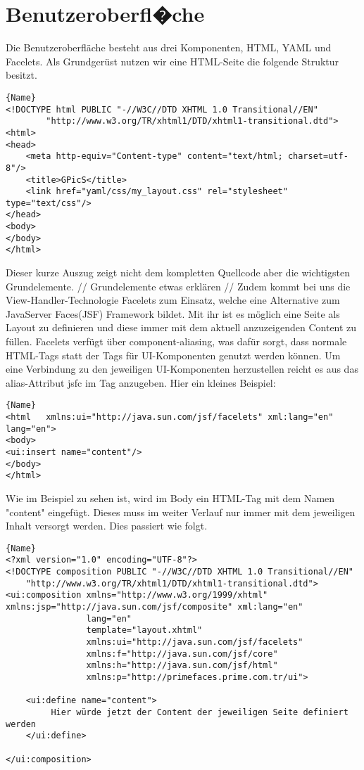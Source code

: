 \section{Benutzeroberfl�che}
\label{JumpBenutzeroberflaeche}
Die Benutzeroberfläche besteht aus drei Komponenten, HTML, YAML und Facelets. Als Grundgerüst nutzen wir eine HTML-Seite die folgende Struktur besitzt. 
\begin{lstlisting}[caption=HTML-Grundgerüst]{Name}
<!DOCTYPE html PUBLIC "-//W3C//DTD XHTML 1.0 Transitional//EN"
        "http://www.w3.org/TR/xhtml1/DTD/xhtml1-transitional.dtd">
<html>
<head>
	<meta http-equiv="Content-type" content="text/html; charset=utf-8"/>
	<title>GPicS</title>
	<link href="yaml/css/my_layout.css" rel="stylesheet" type="text/css"/>
</head>
<body>
</body>
</html>    
\end{lstlisting}
Dieser kurze Auszug zeigt nicht dem kompletten Quellcode aber die wichtigsten Grundelemente.
//
Grundelemente etwas erklären
//
Zudem kommt bei uns die View-Handler-Technologie Facelets zum Einsatz, welche eine Alternative zum JavaServer Faces(JSF) Framework bildet. Mit ihr ist es möglich eine Seite als Layout zu definieren und diese immer mit dem aktuell anzuzeigenden Content zu füllen. Facelets verfügt über component-aliasing, was dafür sorgt, dass normale HTML-Tags statt der Tags für UI-Komponenten genutzt werden können. Um eine Verbindung zu den jeweiligen UI-Komponenten herzustellen reicht es aus das alias-Attribut jsfc im Tag anzugeben. Hier ein kleines Beispiel:
\begin{lstlisting}[caption=Facelets HTML-Tag]{Name}
<html   xmlns:ui="http://java.sun.com/jsf/facelets" xml:lang="en" lang="en">
<body>
<ui:insert name="content"/>
</body>
</html>
\end{lstlisting}
Wie im Beispiel zu sehen ist, wird im Body ein HTML-Tag mit dem Namen "content" eingefügt. Dieses muss im weiter Verlauf nur immer mit dem jeweiligen Inhalt versorgt werden. Dies passiert wie folgt.
\begin{lstlisting}[caption=Facelets HTML-Tag]{Name}
<?xml version="1.0" encoding="UTF-8"?>
<!DOCTYPE composition PUBLIC "-//W3C//DTD XHTML 1.0 Transitional//EN"
    "http://www.w3.org/TR/xhtml1/DTD/xhtml1-transitional.dtd">
<ui:composition xmlns="http://www.w3.org/1999/xhtml" xmlns:jsp="http://java.sun.com/jsf/composite" xml:lang="en"
                lang="en"
                template="layout.xhtml"
                xmlns:ui="http://java.sun.com/jsf/facelets"
                xmlns:f="http://java.sun.com/jsf/core"
                xmlns:h="http://java.sun.com/jsf/html"
                xmlns:p="http://primefaces.prime.com.tr/ui">

    <ui:define name="content">
    	 Hier würde jetzt der Content der jeweiligen Seite definiert werden
    </ui:define>

</ui:composition>
\end{lstlisting}

